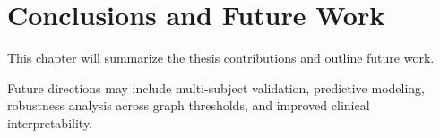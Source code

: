 \chapter{Conclusions and Future Work}

This chapter will summarize the thesis contributions and outline future work.

Future directions may include multi-subject validation, predictive modeling, robustness analysis across graph thresholds, and improved clinical interpretability.

